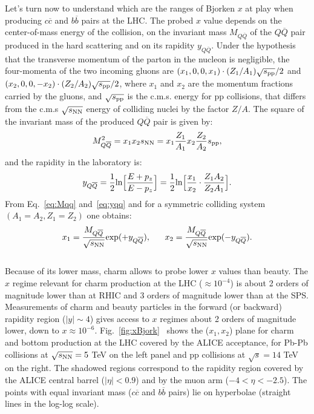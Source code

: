 Let's turn now to understand which are the ranges of Bjorken $x$
at play when producing $c\overline{c}$ and $b\overline{b}$ pairs at the LHC. 
The probed $x$ value depends on the center-of-mass energy
of the collision, on the invariant mass $M_{Q\overline{Q}}$ of the 
$Q\overline{Q}$ pair produced in the hard scattering
and on its rapidity $y_{Q\overline{Q}}$. Under the hypothesis 
that the transverse momentum of the parton 
in the nucleon is negligible, the four-momenta of the two 
incoming gluons are $(x_1,0,0,x_1)\cdot(Z_1/A_1)\sqrt{s_{\rm pp}}/2$
and $(x_2,0,0,-x_2)\cdot(Z_2/A_2)\sqrt{s_{\rm pp}}/2$, where 
$x_1$ and $x_2$ are the momentum fractions 
carried by the gluons, and $\sqrt{s_{\rm pp}}$ is the c.m.s. energy for pp collisions,
that differs from the c.m.s $\sqrt{s_{\rm NN}}$ energy of colliding nuclei by the factor $Z/A$. 
The square of the invariant mass of the produced $Q\overline{Q}$ pair is given by:
\begin{equation}
\label{eq:Mqq}
M_{Q\overline{Q}}^2 =  x_1 x_2 s_{\rm NN} = x_1 \frac{Z_1}{A_1} x_2 \frac{Z_2}{A_2} s_{\rm pp},
\end{equation}
and the rapidity in the laboratory is:
\begin{equation}
\label{eq:yqq}
y_{Q\overline{Q}} = \frac{1}{2} {\rm ln} {\Big [ } \frac{E +p_z}{E-p_z}  {\Big ] }= \frac{1}{2} {\rm ln} {\Big [ } \frac{x_1}{x_2} \cdot \frac{Z_1 A_2}{Z_2 A_1} {\Big ] }.    
\end{equation}
From Eq.~\ref{eq:Mqq} and~\ref{eq:yqq} and for a symmetric colliding system $(A_1 = A_2, Z_1 = Z_2)$
one obtains:
\begin{equation}
\label{eq:x1x2}
x_1 = \frac{M_{Q\overline{Q}}}{\sqrt{s_{\rm NN}}} {\rm exp} (+y_{Q\overline{Q}} ), \; \; \; \; \; \;
x_2 = \frac{M_{Q\overline{Q}}}{\sqrt{s_{\rm NN}}} {\rm exp} (-y_{Q\overline{Q}} ). 
\end{equation}\\




Because of its lower mass, charm allows to probe lower $x$ values than beauty. 
The $x$ regime relevant for charm production at the LHC ($\approx 10^{-4}$) is about 
2 orders of magnitude lower than at RHIC and 3 orders of magnitude lower than at the SPS.
Measurements of charm and beauty particles in the forward (or backward) rapidity region ($|y| \sim 4 $) 
gives access to $x$ regimes about 2 orders of magnitude lower, down to $x \approx 10^{-6}$.
Fig.~\ref{fig:xBjork}~\cite{Alessandro:2006yt} shows the ($x_1, x_2$) 
plane for charm and bottom production at the LHC
covered by the ALICE acceptance, for Pb-Pb
collisions at $\sqrt{s_{\rm NN}} = 5$ TeV on the left panel and pp collisions 
at $\sqrt{s} = 14$ TeV on the right.
The shadowed regions correspond to the rapidity region covered 
by the ALICE central barrel ($|\eta| < 0.9$) and by the 
muon arm ($-4 < \eta < -2.5$).
The points with equal invariant mass ($c\overline{c}$ and $b\overline{b}$ pairs) lie on hyperbolae (straight lines in the log-log scale).\\


